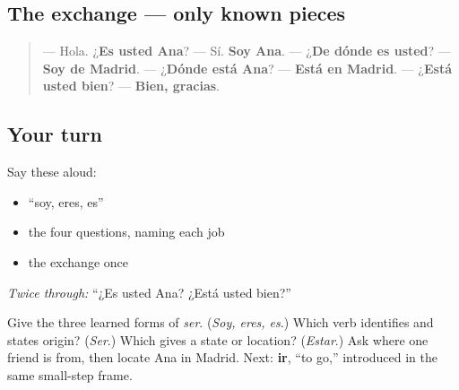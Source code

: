\subsection*{The exchange — only known pieces}
\begin{quote}
— Hola. ¿\textbf{Es usted Ana}? — Sí. \textbf{Soy Ana}. — ¿\textbf{De dónde es usted}? — \textbf{Soy de Madrid}. — ¿\textbf{Dónde está Ana}? — \textbf{Está en Madrid}. — ¿\textbf{Está usted bien}? — \textbf{Bien, gracias}.
\end{quote}

\subsection*{Your turn}
Say these aloud:

\begin{itemize}
\raggedright
  \item “soy, eres, es”
  \item the four questions, naming each job
  \item the exchange once
\end{itemize}

\emph{Twice through:} “¿Es usted Ana? ¿Está usted bien?”

\begin{tcolorbox}[breakable,colback=teal!4,colframe=teal!35!black,title={Before you move on}]
Give the three learned forms of \emph{ser}. (\emph{Soy, eres, es}.) Which verb identifies and states origin? (\emph{Ser}.) Which gives a state or location? (\emph{Estar}.) Ask where one friend is from, then locate Ana in Madrid. Next: \textbf{ir}, “to go,” introduced in the same small-step frame.
\end{tcolorbox}
